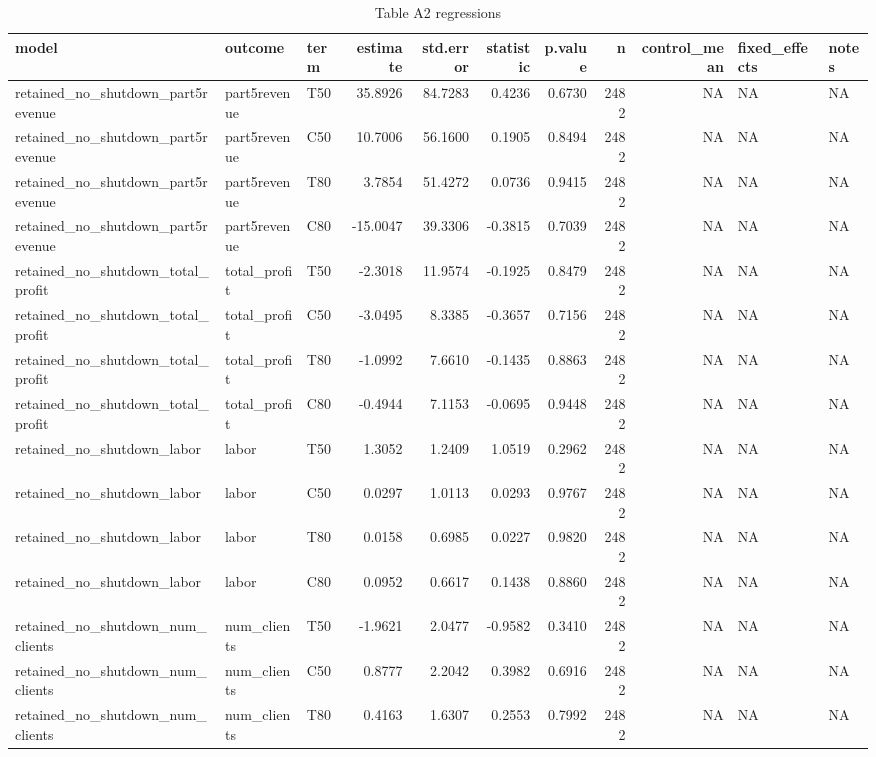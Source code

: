 \begin{table}

\caption{Table A2 regressions}
\centering
\begin{tabular}[t]{lllrrrrrrll}
\toprule
model & outcome & term & estimate & std.error & statistic & p.value & n & control\_mean & fixed\_effects & notes\\
\midrule
retained\_no\_shutdown\_part5revenue & part5revenue & T50 & 35.8926 & 84.7283 & 0.4236 & 0.6730 & 2482 & NA & NA & NA\\
retained\_no\_shutdown\_part5revenue & part5revenue & C50 & 10.7006 & 56.1600 & 0.1905 & 0.8494 & 2482 & NA & NA & NA\\
retained\_no\_shutdown\_part5revenue & part5revenue & T80 & 3.7854 & 51.4272 & 0.0736 & 0.9415 & 2482 & NA & NA & NA\\
retained\_no\_shutdown\_part5revenue & part5revenue & C80 & -15.0047 & 39.3306 & -0.3815 & 0.7039 & 2482 & NA & NA & NA\\
retained\_no\_shutdown\_total\_profit & total\_profit & T50 & -2.3018 & 11.9574 & -0.1925 & 0.8479 & 2482 & NA & NA & NA\\
\addlinespace
retained\_no\_shutdown\_total\_profit & total\_profit & C50 & -3.0495 & 8.3385 & -0.3657 & 0.7156 & 2482 & NA & NA & NA\\
retained\_no\_shutdown\_total\_profit & total\_profit & T80 & -1.0992 & 7.6610 & -0.1435 & 0.8863 & 2482 & NA & NA & NA\\
retained\_no\_shutdown\_total\_profit & total\_profit & C80 & -0.4944 & 7.1153 & -0.0695 & 0.9448 & 2482 & NA & NA & NA\\
retained\_no\_shutdown\_labor & labor & T50 & 1.3052 & 1.2409 & 1.0519 & 0.2962 & 2482 & NA & NA & NA\\
retained\_no\_shutdown\_labor & labor & C50 & 0.0297 & 1.0113 & 0.0293 & 0.9767 & 2482 & NA & NA & NA\\
\addlinespace
retained\_no\_shutdown\_labor & labor & T80 & 0.0158 & 0.6985 & 0.0227 & 0.9820 & 2482 & NA & NA & NA\\
retained\_no\_shutdown\_labor & labor & C80 & 0.0952 & 0.6617 & 0.1438 & 0.8860 & 2482 & NA & NA & NA\\
retained\_no\_shutdown\_num\_clients & num\_clients & T50 & -1.9621 & 2.0477 & -0.9582 & 0.3410 & 2482 & NA & NA & NA\\
retained\_no\_shutdown\_num\_clients & num\_clients & C50 & 0.8777 & 2.2042 & 0.3982 & 0.6916 & 2482 & NA & NA & NA\\
retained\_no\_shutdown\_num\_clients & num\_clients & T80 & 0.4163 & 1.6307 & 0.2553 & 0.7992 & 2482 & NA & NA & NA\\

\end{tabular}
\end{table}
